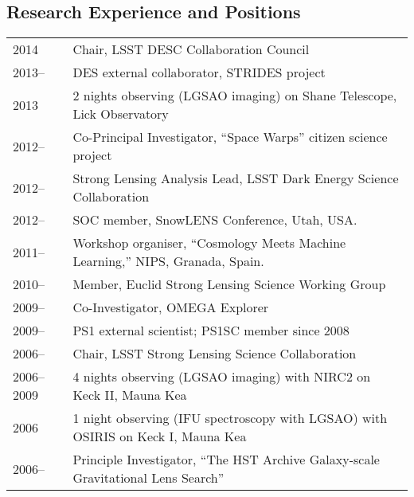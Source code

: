 \subsection*{Research Experience and Positions}

%

\noindent
\begin{tabular}{@{}p{2.5cm}p{15.5cm}}
2014        & Chair, LSST DESC Collaboration Council \\
2013--      & DES external collaborator, STRIDES project \\
2013        & 2 nights observing (LGSAO imaging) on Shane Telescope, Lick Observatory\\
2012--      & Co-Principal Investigator, ``Space Warps'' citizen science project \\
2012--      & Strong Lensing Analysis Lead, LSST Dark Energy Science Collaboration \\
2012--      & SOC member, SnowLENS Conference, Utah, USA. \\
2011--      & Workshop organiser, ``Cosmology Meets Machine Learning,'' NIPS, Granada, Spain. \\
2010--      & Member, Euclid Strong Lensing Science Working Group\\
2009--      & Co-Investigator, OMEGA Explorer\\
2009--      & PS1 external scientist;  PS1SC member since 2008 \\
2006--      & Chair, LSST Strong Lensing Science Collaboration\\
2006--2009  & 4 nights observing (LGSAO imaging) with NIRC2 on Keck II, Mauna Kea\\
2006        & 1 night observing (IFU spectroscopy with LGSAO) with OSIRIS on Keck I, Mauna Kea\\
2006--      & Principle Investigator, ``The HST Archive Galaxy-scale Gravitational Lens Search''  \\

\end{tabular}
